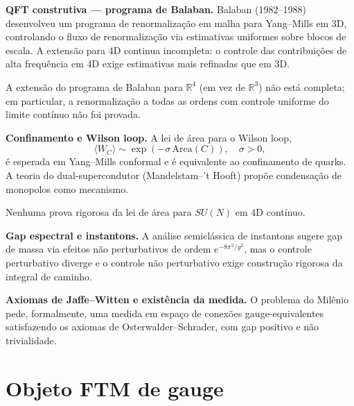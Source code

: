 \documentclass[11pt,a4paper]{article}
\begin{document}
\begin{programs}

\item \textbf{QFT construtiva — programa de Balaban.}
Balaban (1982–1988) desenvolveu um programa de renormalização
em malha para Yang–Mills em 3D, controlando o fluxo de
renormalização via estimativas uniformes sobre blocos de escala.
A extensão para 4D continua incompleta: o controle das
contribuições de alta frequência em 4D exige estimativas
mais refinadas que em 3D.

\begin{gap}
A extensão do programa de Balaban para $\mathbb R^4$
(em vez de $\mathbb R^3$) não está completa; em particular,
a renormalização a todas as ordens com controle uniforme
do limite contínuo não foi provada. \OPEN
\end{gap}

\item \textbf{Confinamento e Wilson loop.}
A lei de área para o Wilson loop,
\[
  \langle W_C\rangle \sim \exp(-\sigma\,\mathrm{Area}(C)),
  \quad \sigma>0,
\]
é esperada em Yang–Mills conformal e é equivalente ao confinamento
de quarks. A teoria do dual-supercondutor (Mandelstam–'t Hooft)
propõe condensação de monopolos como mecanismo.

\begin{gap}
Nenhuma prova rigorosa da lei de área para $SU(N)$ em 4D contínuo. \OPEN
\end{gap}

\item \textbf{Gap espectral e instantons.}
A análise semiclássica de instantons sugere gap de massa
via efeitos não perturbativos de ordem $e^{-8\pi^2/g^2}$,
mas o controle perturbativo diverge e o controle não perturbativo
exige construção rigorosa da integral de caminho.

\item \textbf{Axiomas de Jaffe–Witten e existência da medida.}
O problema do Milênio pede, formalmente, uma medida em espaço
de conexões gauge-equivalentes satisfazendo os axiomas
de Osterwalder–Schrader, com gap positivo e não trivialidade.

\end{programs}

\section{Objeto FTM de gauge}
\end{document}
